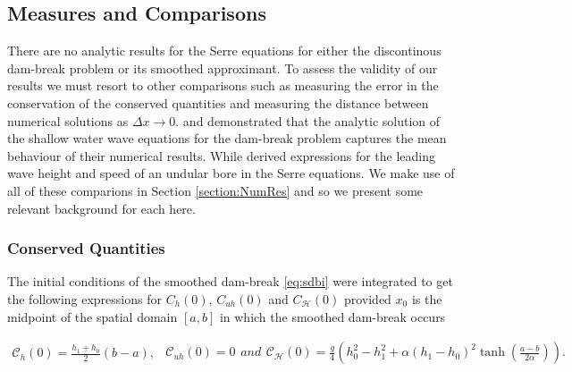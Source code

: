 \documentclass[times]{elsarticle}
\begin{document}
\subsection{Measures and Comparisons}
There are no analytic results for the Serre equations for either the discontinous dam-break problem or its smoothed approximant. To assess the validity of our results we must resort to other comparisons such as measuring the error in the conservation of the conserved quantities and measuring the distance between numerical solutions as $\Delta x \rightarrow 0$. \citet{Hank-etal-2010-2034} and \citet{Mitsotakis-etal-2014} demonstrated that the analytic solution of the shallow water wave equations for the dam-break problem captures the mean behaviour of their numerical results. While \citet{El-etal-2006} derived expressions for the leading wave height and speed of an undular bore in the Serre equations. We make use of all of these comparions in Section \ref{section:NumRes} and so we present some relevant background for each here. 


\subsubsection{Conserved Quantities}
The initial conditions of the smoothed dam-break \eqref{eq:sdbi} were integrated to get the following expressions for $C_{h}(0)$, $C_{uh}(0)$ and $C_{\mathcal{H}}(0)$ provided $x_0$ is the midpoint of the spatial domain $\left[a,b \right]$ in which the smoothed dam-break occurs
\begin{linenomath*}
	\begin{subequations}
	\begin{gather*}
	\mathcal{C}_{h}(0) = \frac{h_1 + h_0}{2}\left(b- a\right),
	\label{eq:Chdef}
	\end{gather*}
	\begin{gather*}
	\mathcal{C}_{uh}(0) = 0
	\label{eq:Cuhdef}
	\end{gather*}
		and
	\begin{gather*}
	\mathcal{C}_{\mathcal{H}}(0) = \frac{g}{4} \left(h_0^2 - h_1^2 + \alpha\left(h_1 - h_0\right)^2\tanh\left(\frac{a - b}{2 \alpha}\right)\right).
	\label{eq:CHdef}
	\end{gather*}
		\label{eq:Canalyticvalues}	
	\end{subequations}
\end{linenomath*}
\end{document}
